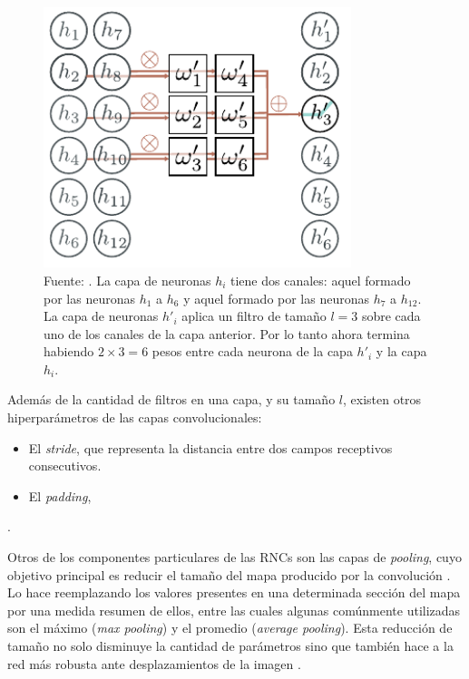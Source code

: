 \documentclass[../../main.tex]{subfiles}
\begin{document}
\begin{figure}
    \centering
    \includegraphics[width=0.8\textwidth]{figs/conv-layer-multi-channel.png}
    \caption{Fuente: \cite{prince2024understanding}. La capa de neuronas \(h_i\) tiene
    dos canales: aquel formado por las neuronas \(h_1\) a \(h_6\) y aquel formado
    por las neuronas \(h_7\) a \(h_{12}\). La capa de neuronas \(h'_i\) aplica un
    filtro de tamaño \(l=3\) sobre cada uno de los canales de la capa anterior. Por
    lo tanto ahora termina habiendo \(2 \times 3 = 6\) pesos entre cada neurona de la
    capa \(h'_i\) y la capa \(h_i\).}
    \label{fig:conv-layer-multi-channel}
\end{figure}

Además de la cantidad de filtros en una capa, y su tamaño \(l\), existen otros
hiperparámetros de las capas convolucionales:
\begin{itemize}[noitemsep]
    \item El \textit{stride}, que representa la distancia entre dos campos receptivos
    consecutivos.
    \item El \textit{padding}, 
\end{itemize}
\cite{deep-learning-with-pytorch}.

Otros de los componentes particulares de las RNCs son las capas de \textit{pooling}, cuyo
objetivo principal es reducir el tamaño del mapa producido por la convolución
\cite{hands-on-ML-sklearn-tf}. Lo hace reemplazando los valores presentes en una
determinada sección del mapa por una medida resumen de ellos, entre las cuales algunas
comúnmente utilizadas son el máximo (\textit{max pooling}) y el promedio (\textit{average
pooling}). Esta reducción de tamaño no solo disminuye la cantidad de parámetros sino que
también hace a la red más robusta ante desplazamientos de la imagen
\cite{hands-on-ML-sklearn-tf}.
\end{document}
